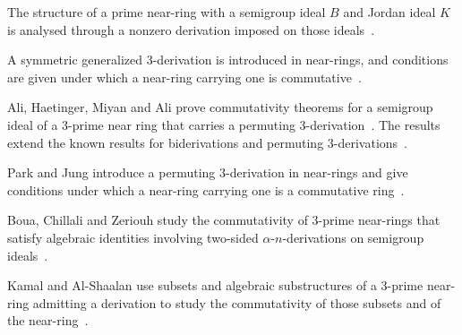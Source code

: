 The structure of a prime near-ring with a semigroup ideal $B$ and Jordan ideal
$K$ is analysed through a nonzero derivation imposed on those
ideals~\cite{WlStructuralPropertiesOfPrimeNea2019}.

A symmetric generalized 3-derivation is introduced in near-rings, and
conditions are given under which a near-ring carrying one is
commutative~\cite{WlOnSymmetricGeneralized3Derivat2016}.

Ali, Haetinger, Miyan and Ali prove commutativity theorems for a semigroup
ideal of a 3-prime near ring that carries a permuting 3-derivation~\cite{WlSemigroupIdealsAndPermuting3De2015}. The results
extend
the known results for biderivations and permuting
3-derivations~\cite{WlSemigroupIdealsAndPermuting3De2015}.

Park and Jung introduce a permuting 3-derivation in near-rings and give
conditions under which a near-ring carrying one is a commutative
ring~\cite{WlOnPermuting3DerivationsAndComm2010}.

Boua, Chillali and Zeriouh study the commutativity of 3-prime near-rings that
satisfy algebraic identities involving two-sided $\alpha$-$n$-derivations on
semigroup ideals~\cite{WlDifferentialConditionsForWhich2018}.

Kamal and Al-Shaalan use subsets and algebraic substructures of a 3-prime
near-ring admitting a derivation to study the commutativity of those subsets
and of the near-ring~\cite{WlCommutativityOfNearRingsWithDe2012}.

